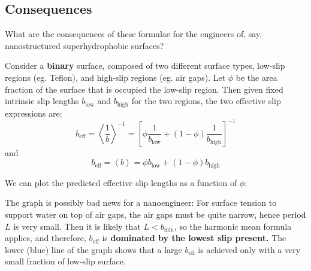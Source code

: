 \documentclass[a4paper]{report}
\newcommand{\beff}{\ensuremath{b_{\mathrm{eff}}}}
\newcommand{\bmin}{\ensuremath{b_{\mathrm{min}}}}
\newcommand{\blo}{\ensuremath{b_{\mathrm{low}}}}
\newcommand{\bhi}{\ensuremath{b_{\mathrm{high}}}}
\begin{document}

\subsection*{Consequences}

What are the consequences of these formulae for the engineers of, say, nanostructured superhydrophobic surfaces?

Consider a \textbf{binary} surface, composed of two different surface types, low-slip regions (eg. Teflon), and high-slip regions (eg. air gaps).  Let $\phi$ be the area fraction of the surface that is occupied the low-slip region.  
Then given fixed intrinsic slip lengths $\blo$ and $\bhi$ for the two regions, the two effective slip expressions are:
\begin{equation}
\beff = \left< \frac{1}{b} \right>^{-1} =
\left[ \phi \frac{1}{\blo} + (1-\phi) \frac{1}{\bhi} \right]^{-1}
\end{equation}
and
\begin{equation}
\beff = \left< b \right> = \phi \blo + (1-\phi) \bhi 
\end{equation}

\clearpage
We can plot the predicted effective slip lengths as a function of $\phi$:

\begin{center}
\end{center}

The graph is possibly bad news for a nanoengineer: For surface tension to support water on top of air gaps, the air gaps must be quite narrow, hence period $L$ is very small.  Then it is likely that $L < \bmin$, so the harmonic mean formula applies, and therefore, $\beff$ is \textbf{dominated by the lowest slip present.}  The lower (blue) line of the graph shows that a large $\beff$ is achieved only with a very small fraction of low-slip surface.
\end{document}
